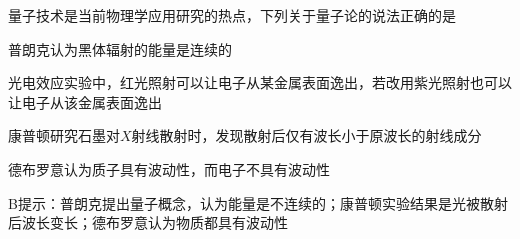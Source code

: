 量子技术是当前物理学应用研究的热点，下列关于量子论的说法正确的是\paren[]
\begin{choices}
	\item 普朗克认为黑体辐射的能量是连续的
	\item 光电效应实验中，红光照射可以让电子从某金属表面逸出，若改用紫光照射也可以让电子从该金属表面逸出
	\item 康普顿研究石墨对\(X\)射线散射时，发现散射后仅有波长小于原波长的射线成分
	\item 德布罗意认为质子具有波动性，而电子不具有波动性
\end{choices}
\begin{answer}
	B\qquad 提示：普朗克提出量子概念，认为能量是不连续的；康普顿实验结果是光被散射后波长变长；德布罗意认为物质都具有波动性
\end{answer}